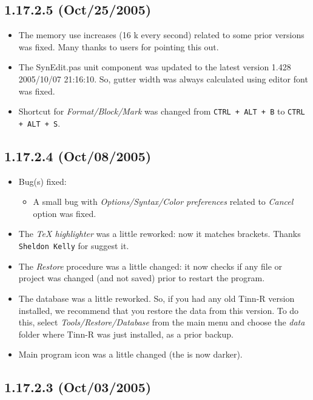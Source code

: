 \subsection{1.17.2.5 (Oct/25/2005)}

\begin{itemize}
  \item The memory use increases (16 k every second) related to
    some prior versions was fixed. Many thanks to users for pointing this out.
  \item The SynEdit.pas unit component was updated to the latest version
    1.428 2005/10/07 21:16:10. So, gutter width was always calculated
    using editor font was fixed.
  \item Shortcut for \textit{Format/Block/Mark} was changed from
    \texttt{CTRL + ALT + B} to \texttt{CTRL + ALT + S}.
\end{itemize}


\subsection{1.17.2.4 (Oct/08/2005)}

\begin{itemize}
  \item Bug(s) fixed:
    \begin{itemize}
      \item A small bug with \textit{Options/Syntax/Color preferences}
        related to \textit{Cancel} option was fixed.
    \end{itemize}
  \item The \textit{TeX highlighter} was a little reworked: now it
    matches brackets. Thanks \texttt{Sheldon Kelly} for suggest it.
  \item The \textit{Restore} procedure was a little changed: it now
    checks if any file or project was changed (and not saved) prior
    to restart the program.
  \item The database was a little reworked. So, if you had any old
    Tinn-R version installed, we recommend that you restore the
    data from this version. To do this, select \textit{Tools/Restore/Database}
    from the main menu and choose the \textit{data} folder where Tinn-R
    was just installed, as a prior backup.
  \item Main program icon was a little changed (the \RR{} is now darker).
\end{itemize}


\subsection{1.17.2.3 (Oct/03/2005)}

